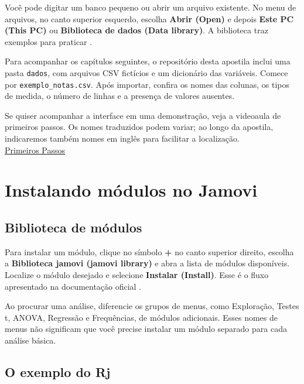 Você pode digitar um banco pequeno ou abrir um arquivo existente. No menu de arquivos, no canto superior esquerdo, escolha \textbf{Abrir (Open)} e depois \textbf{Este PC (This PC)} ou \textbf{Biblioteca de dados (Data library)}. A biblioteca traz exemplos para praticar \parencite{JamoviPrimeirosPassos}.

Para acompanhar os capítulos seguintes, o repositório desta apostila inclui uma pasta \texttt{dados}, com arquivos CSV fictícios e um dicionário das variáveis. Comece por \texttt{exemplo\_notas.csv}. Após importar, confira os nomes das colunas, os tipos de medida, o número de linhas e a presença de valores ausentes.

\begin{tcolorbox}[colback=white,colframe=green,title={Dica de Conteúdo}]
Se quiser acompanhar a interface em uma demonstração, veja a videoaula de primeiros passos. Os nomes traduzidos podem variar; ao longo da apostila, indicaremos também nomes em inglês para facilitar a localização.\\
\faYoutube{} \href{https://www.youtube.com/watch?v=bV9hlHPLe5I&t=5s}{Primeiros Passos}
\end{tcolorbox}

\section{Instalando módulos no Jamovi}

\subsection{Biblioteca de módulos}

Para instalar um módulo, clique no símbolo \textbf{+} no canto superior direito, escolha a \textbf{Biblioteca jamovi (jamovi library)} e abra a lista de módulos disponíveis. Localize o módulo desejado e selecione \textbf{Instalar (Install)}. Esse é o fluxo apresentado na documentação oficial \parencite{JamoviModulos}.

Ao procurar uma análise, diferencie os grupos de menus, como Exploração, Testes t, ANOVA, Regressão e Frequências, de módulos adicionais. Esses nomes de menus não significam que você precise instalar um módulo separado para cada análise básica.

\subsection{O exemplo do Rj}

